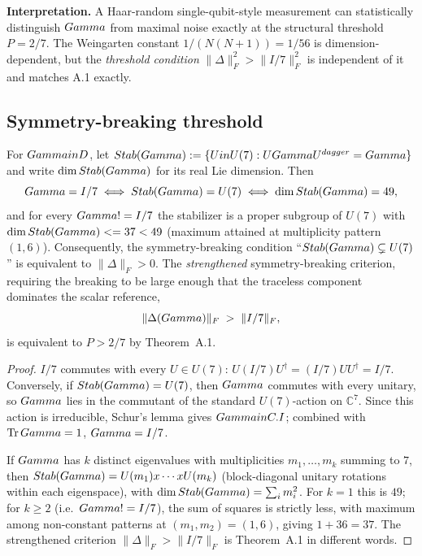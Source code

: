 \textbf{Interpretation.} A Haar-random single-qubit-style measurement can
statistically distinguish $Gamma$ from maximal noise exactly at the structural
threshold $P = 2/7$. The Weingarten constant $1/(N(N+1)) = 1/56$ is
dimension-dependent, but the \emph{threshold condition}
$\|\Delta\|_F^2 > \|I/7\|_F^2$ is independent of it and matches A.1 exactly.

\subsection{Symmetry-breaking threshold}
\label{app:pcrit-symmetry}

\begin{theorembox}
For $Gamma in D$, let $Stab(Gamma) := \{U in U(7) : UGamma U^{dagger} = Gamma\}$
and write $\dim Stab(Gamma)$ for its real Lie dimension. Then
\[
  Gamma = I/7
  \;\Longleftrightarrow\;
  Stab(Gamma) = U(7)
  \;\Longleftrightarrow\;
  \dim Stab(Gamma) = 49,
\]
and for every $Gamma != I/7$ the stabilizer is a proper subgroup of $U(7)$
with $\dim Stab(Gamma) <= 37 < 49$ (maximum attained at
multiplicity pattern $(1,6)$). Consequently, the
symmetry-breaking condition
``$Stab(Gamma) \subsetneq U(7)$'' is equivalent to $\|\Delta\|_F > 0$.
The \emph{strengthened} symmetry-breaking criterion, requiring the breaking
to be large enough that the traceless component dominates the scalar
reference,
\[
  \|\Delta(Gamma)\|_F \;>\; \|I/7\|_F,
\]
is equivalent to $P > 2/7$ by Theorem~A.1.
\end{theorembox}

\begin{proof}
$I/7$ commutes with every $U \in U(7)$: $U(I/7)U^{\dagger} = (I/7)UU^{\dagger} = I/7$.
Conversely, if $Stab(Gamma) = U(7)$, then $Gamma$ commutes with every
unitary, so $Gamma$ lies in the commutant of the standard $U(7)$-action on
$\mathbb{C}^7$. Since this action is irreducible, Schur's lemma gives
$Gamma in C. I$; combined with $\Tr Gamma = 1$, $Gamma = I/7$.

If $Gamma$ has $k$ distinct eigenvalues with multiplicities
$m_1,\dots,m_k$ summing to $7$, then
$Stab(Gamma) = U(m_1)x\cdots x U(m_k)$ (block-diagonal
unitary rotations within each eigenspace), with
$\dim Stab(Gamma) = \sum_i m_i^2$. For $k = 1$ this is $49$; for
$k \geq 2$ (i.e.\ $Gamma != I/7$), the sum of squares is strictly less,
with maximum among non-constant patterns at $(m_1,m_2) = (1,6)$, giving
$1 + 36 = 37$. The strengthened criterion $\|\Delta\|_F > \|I/7\|_F$ is
Theorem~A.1 in different words.
\end{proof}

